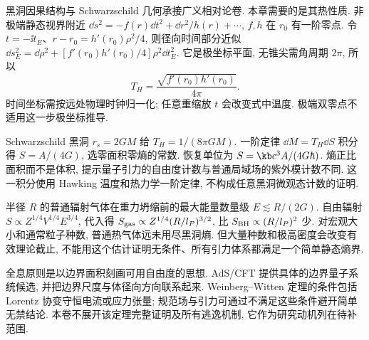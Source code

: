 \label{ch:holography}
黑洞因果结构与 Schwarzschild 几何承接广义相对论卷. 本章需要的是其热性质. 非极端静态视界附近 $\dd s^2=-f(r)\dd t^2+\dd r^2/h(r)+\cdots$, $f,h$ 在 $r_0$ 有一阶零点. 令 $t=-\ii t_E$、$r-r_0=h'(r_0)\rho^2/4$, 则径向时间部分近似
$\dd s_E^2=\dd\rho^2+[f'(r_0)h'(r_0)/4]\rho^2\dd t_E^2$.
它是极坐标平面, 无锥尖需角周期 $2\pi$, 所以
\begin{equation}\label{eq:Hawking}
T_H=\frac{\sqrt{f'(r_0)h'(r_0)}}{4\pi}.
\end{equation}
时间坐标需按远处物理时钟归一化; 任意重缩放 $t$ 会改变式中温度. 极端双零点不适用这一步极坐标推导.

Schwarzschild 黑洞 $r_s=2GM$ 给 $T_H=1/(8\pi GM)$. 一阶定律 $\dd M=T_H\dd S$ 积分得 $S=A/(4G)$, 选零面积零熵的常数. 恢复单位为 $S=\kb c^3A/(4G\hbar)$. 熵正比面积而不是体积, 提示量子引力的自由度计数与普通局域场的紫外模计数不同. 这一积分使用 Hawking 温度和热力学一阶定律, 不构成任意黑洞微观态计数的证明.

半径 $R$ 的普通辐射气体在重力坍缩前的最大能量数量级 $E\lesssim R/(2G)$. 自由辐射 $S\propto Z^{1/4}V^{1/4}E^{3/4}$, 代入得 $S_{\rm gas}\propto Z^{1/4}(R/l_P)^{3/2}$, 比 $S_{\rm BH}\propto(R/l_P)^2$ 少. 对宏观大小和通常粒子种数, 普通热气体远未用尽黑洞熵. 但大量种数和极高密度会改变有效理论截止, 不能用这个估计证明无条件、所有引力体系都满足一个简单静态熵界.

全息原则是以边界面积刻画可用自由度的思想. AdS/CFT 提供具体的边界量子系统候选, 并把边界尺度与体径向方向联系起来. Weinberg--Witten 定理的条件包括 Lorentz 协变守恒电流或应力张量; 规范场与引力可通过不满足这些条件避开简单无禁结论. 本卷不展开该定理完整证明及所有逃逸机制, 它作为研究动机列在待补范围.
